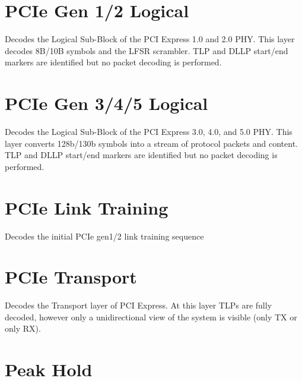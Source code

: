 \pagebreak
\section{PCIe Gen 1/2 Logical}

Decodes the Logical Sub-Block of the PCI Express 1.0 and 2.0 PHY. This layer decodes 8B/10B symbols and the LFSR
scrambler. TLP and DLLP start/end markers are identified but no packet decoding is performed.

\pagebreak
\section{PCIe Gen 3/4/5 Logical}

Decodes the Logical Sub-Block of the PCI Express 3.0, 4.0, and 5.0 PHY. This layer converts 128b/130b symbols into a
stream of protocol packets and content. TLP and DLLP start/end markers are identified but no packet decoding is
performed.

\pagebreak
\section{PCIe Link Training}

Decodes the initial PCIe gen1/2 link training sequence

\pagebreak
\section{PCIe Transport}

Decodes the Transport layer of PCI Express. At this layer TLPs are fully decoded, however only a unidirectional view
of the system is visible (only TX or only RX).

\pagebreak
\section{Peak Hold}


